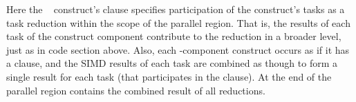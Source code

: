 Here the ~ construct's 
 clause specifies participation of the construct's tasks as 
a task reduction within the scope of the parallel region.  
That is, the results of each task of the  construct component 
contribute to the reduction in a broader level, just as in  code section above.
Also, each -component construct
occurs as if it has a  clause, and the
SIMD results of each task are combined as though to form a single result for
each task (that participates in the  clause).
At the end of the parallel region  contains the combined result of all reductions.






